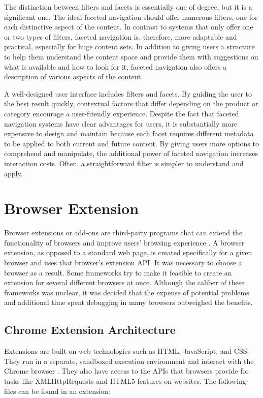 The distinction between filters and facets is essentially one of degree, but it is a significant one. The ideal faceted navigation should offer numerous filters, one for each distinctive aspect of the content. In contrast to systems that only offer one or two types of filters, faceted navigation is, therefore, more adaptable and practical, especially for huge content sets. In addition to giving users a structure to help them understand the content space and provide them with suggestions on what is available and how to look for it, faceted navigation also offers a description of various aspects of the content.

A well-designed user interface includes filters and facets. By guiding the user to the best result quickly, contextual factors that differ depending on the product or category encourage a user-friendly experience. Despite the fact that faceted navigation systems have clear advantages for users, it is substantially more expensive to design and maintain because each facet requires different metadata to be applied to both current and future content. By giving users more options to comprehend and manipulate, the additional power of faceted navigation increases interaction costs. Often, a straightforward filter is simpler to understand and apply.


\section{Browser Extension}
Browser extensions or add-ons are third-party programs that can extend the functionality of browsers and improve users' browsing experience \autocite{some2019empoweb}. A browser extension, as opposed to a standard web page, is created specifically for a given browser and uses that browser's extension API. It was necessary to choose a browser as a result. Some frameworks try to make it feasible to create an extension for several different browsers at once. Although the caliber of these frameworks was unclear, it was decided that the expense of potential problems and additional time spent debugging in many browsers outweighed the benefits.

\subsection{Chrome Extension Architecture}
Extensions are built on web technologies such as HTML, JavaScript, and CSS. They run in a separate, sandboxed execution environment and interact with the Chrome browser \autocite{google2021what}. They also have access to the APIs that browsers provide for tasks like XMLHttpRequests and HTML5 features on websites. The following files can be found in an extension:

